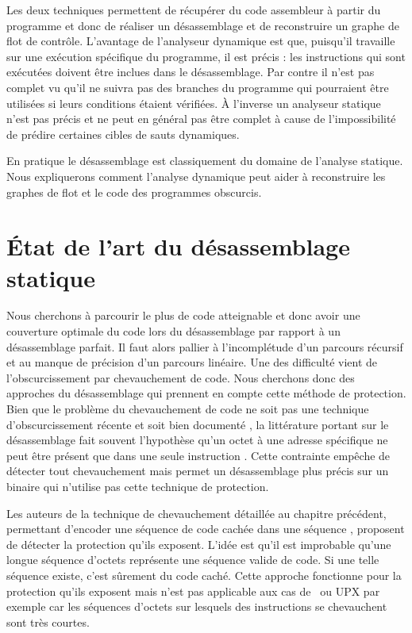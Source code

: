 Les deux techniques permettent de récupérer du code assembleur à partir du programme et donc de réaliser un désassemblage et de reconstruire un graphe de flot de contrôle.
L'avantage de l'analyseur dynamique est que, puisqu'il travaille sur une exécution spécifique du programme, il est précis : les instructions qui sont exécutées doivent être inclues dans le désassemblage.
Par contre il n'est pas complet vu qu'il ne suivra pas des branches du programme qui pourraient être utilisées si leurs conditions étaient vérifiées. À l'inverse un analyseur statique n'est pas précis et ne peut en général pas être complet à cause de l'impossibilité de prédire certaines cibles de sauts dynamiques.

En pratique le désassemblage est classiquement du domaine de l'analyse statique. Nous expliquerons comment l'analyse dynamique peut aider à reconstruire les graphes de flot et le code des programmes obscurcis.

\section{État de l'art du désassemblage statique}
Nous cherchons à parcourir le plus de code atteignable et donc avoir une couverture optimale du code lors du désassemblage par rapport à un désassemblage parfait.
Il faut alors pallier à l'incomplétude d'un parcours récursif et au manque de précision d'un parcours linéaire.
Une des difficulté vient de l'obscurcissement par chevauchement de code. 
Nous cherchons donc des approches du désassemblage qui prennent en compte cette méthode de protection.
\\

Bien que le problème du chevauchement de code ne soit pas une technique d'obscurcissement récente et soit bien documenté \cite{PMA}, la littérature portant sur le désassemblage fait souvent l'hypothèse qu'un octet à une adresse spécifique ne peut être présent que dans une seule instruction \cite{KruegelRVV04}. Cette contrainte empêche de détecter tout chevauchement mais permet un désassemblage plus précis sur un binaire qui n'utilise pas cette technique de protection.



Les auteurs de la technique de chevauchement détaillée au chapitre précédent, permettant d'encoder une séquence de code cachée dans une séquence \cite{JLH13}, proposent de détecter la protection qu'ils exposent. L'idée est qu'il est improbable qu'une longue séquence d'octets représente une séquence valide de code. Si une telle séquence existe, c'est sûrement du code caché. Cette approche fonctionne pour la protection qu'ils exposent mais n'est pas applicable aux cas de \telock\ ou UPX par exemple car les séquences d'octets sur lesquels des instructions se chevauchent sont très courtes.

